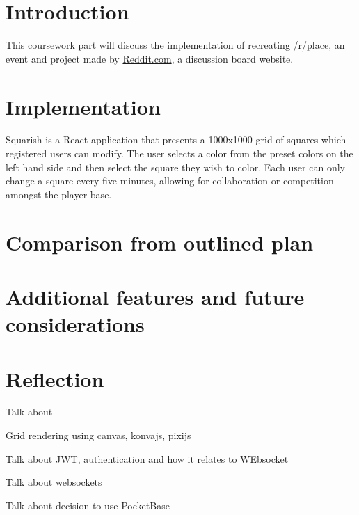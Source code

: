 

\section{Introduction}\label{sec:introduction}

This coursework part will discuss the implementation of recreating /r/place, an event and project made by \href{https://www.reddit.com/}{Reddit.com}, a discussion board website.

\section{Implementation}\label{sec:implementation}

Squarish is a React application that presents a 1000x1000 grid of squares which registered users can modify.
The user selects a color from the preset colors on the left hand side and then select the square they wish to color.
Each user can only change a square every five minutes, allowing for collaboration or competition amongst the player base.


\section{Comparison from outlined plan}\label{sec:comparison-from-outlined-plan}


\section{Additional features and future considerations}\label{sec:additional-features-and-future-considerations}


\section{Reflection}\label{sec:reflection}

Talk about

Grid rendering using canvas, konvajs, pixijs

Talk about JWT, authentication and how it relates to WEbsocket

Talk about websockets

Talk about decision to use PocketBase